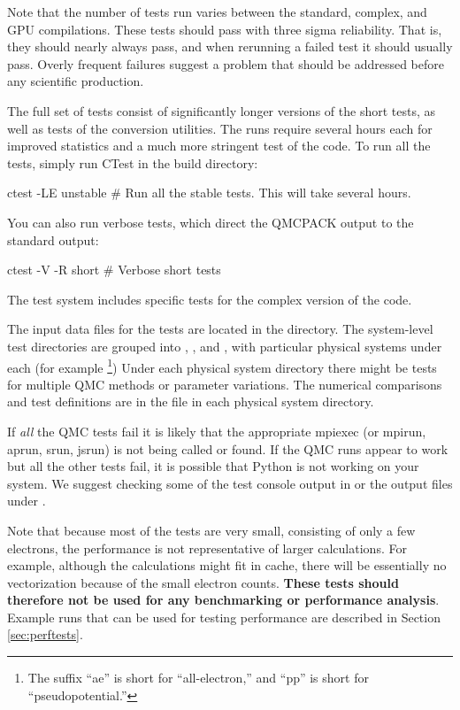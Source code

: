 Note that the number of tests run varies between the
standard, complex, and GPU compilations. These tests should pass with three sigma reliability. That is, they should nearly always pass, and when rerunning a failed test it should usually pass. Overly frequent failures suggest a problem that should be addressed before any scientific production.

The  full set of tests consist of significantly longer versions of the short
tests, as well as tests of the conversion utilities. The runs require
several hours each for improved statistics and a much more
stringent test of the code. To run all the tests, simply run CTest in the build
directory:

\begin{shade}
ctest -LE unstable           # Run all the stable tests. This will take several hours.
\end{shade}

You can also run verbose tests, which direct the QMCPACK
output to the standard output:

\begin{shade}
ctest -V -R short   # Verbose short tests
\end{shade}

The test system includes specific tests for the complex version of the code.

The input data files for the tests are located in the  directory.
The system-level test directories are grouped into , , and , with particular physical systems under each (for example 
\footnote{The suffix ``ae'' is short for ``all-electron,'' and ``pp'' is short for ``pseudopotential.''})
Under each physical system directory there might be tests for multiple QMC methods or parameter variations.
The numerical comparisons and test definitions are in the  file in each physical system directory.

If \textit{all} the QMC tests fail it is likely
that the appropriate mpiexec (or mpirun, aprun, srun, jsrun) is not being
called or found. If the QMC runs appear to work but all the other
tests fail, it is possible that Python is not working on your system. We suggest checking some of the test console output in 
or the output files under .


Note that because most of the tests are very small, consisting of only a few
electrons, the performance is not representative of larger
calculations. For example, although the calculations might fit in cache,
there will be essentially no vectorization because of the small electron
counts. \textbf{These tests should therefore not be used for any benchmarking or
performance analysis}. Example runs that can be used for testing performance are described in
Section \ref{sec:perftests}.

